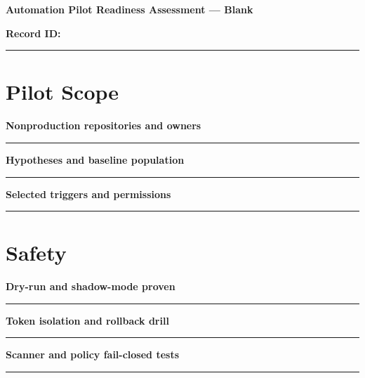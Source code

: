 \documentclass[11pt,letterpaper]{article}
\begin{document}
\begin{center}{\LARGE\bfseries Automation Pilot Readiness Assessment --- Blank}\par
\vspace{4pt}{\small Print-ready unfilled assessment instrument}\par
\end{center}
\noindent\textbf{Record ID:} \rule{2.6in}{0.4pt}\par
\section{Pilot Scope}
\noindent\textbf{Nonproduction repositories and owners}\par
\vspace{1.1em}\noindent\rule{0.96\linewidth}{0.4pt}\par\vspace{0.65em}
\noindent\textbf{Hypotheses and baseline population}\par
\vspace{1.1em}\noindent\rule{0.96\linewidth}{0.4pt}\par\vspace{0.65em}
\noindent\textbf{Selected triggers and permissions}\par
\vspace{1.1em}\noindent\rule{0.96\linewidth}{0.4pt}\par\vspace{0.65em}
\section{Safety}
\noindent\textbf{Dry-run and shadow-mode proven}\par
\vspace{1.1em}\noindent\rule{0.96\linewidth}{0.4pt}\par\vspace{0.65em}
\noindent\textbf{Token isolation and rollback drill}\par
\vspace{1.1em}\noindent\rule{0.96\linewidth}{0.4pt}\par\vspace{0.65em}
\noindent\textbf{Scanner and policy fail-closed tests}\par
\vspace{1.1em}\noindent\rule{0.96\linewidth}{0.4pt}\par\vspace{0.65em}
\end{document}
